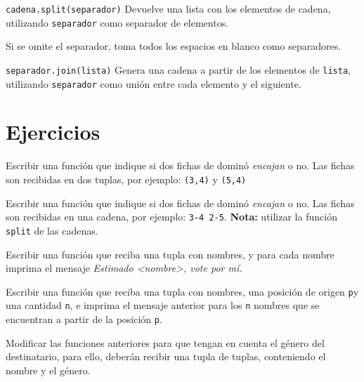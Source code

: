 \begin{referencia_python}
\begin{sintaxis}{\lstinline!cadena.split(separador)!}
Devuelve una lista con los elementos de cadena, utilizando
\lstinline!separador! como separador de elementos.

Si se omite el separador, toma todos los espacios en blanco como
separadores.
\end{sintaxis}

\begin{sintaxis}{\lstinline!separador.join(lista)!}
Genera una cadena a partir de los elementos de \lstinline!lista!,
utilizando \lstinline!separador! como unión entre cada elemento y el
siguiente.
\end{sintaxis}
\end{referencia_python} 


\newpage
\section{Ejercicios}



\begin{partes}
\item Escribir una función que indique si dos fichas de dominó {\it
encajan} o no. Las fichas son recibidas en dos tuplas, por ejemplo:
\verb!(3,4)! y \verb!(5,4)!
\item Escribir una función que indique si dos fichas de dominó {\it
encajan} o no. Las fichas son recibidas en una cadena, por ejemplo:
\verb!3-4 2-5!. {\bf Nota:} utilizar la función \verb!split! de las cadenas.
\end{partes}


\begin{partes}
\item Escribir una función que reciba una tupla con nombres, y para cada
nombre imprima el mensaje {\it Estimado <nombre>, vote por mí.}
\item Escribir una función que reciba una tupla con nombres, una posición
de origen \verb!p!y una cantidad \verb!n!, e imprima el mensaje anterior
para los \verb!n! nombres que se encuentran a partir de la posición
\verb!p!.
\item Modificar las funciones anteriores para que tengan en cuenta el
género del destinatario, para ello, deberán recibir una tupla de tuplas,
conteniendo el nombre y el género.
\end{partes}


